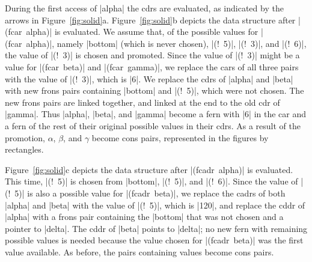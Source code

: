 During the first access of \scheme|alpha| the cdrs are evaluated, as
indicated by the arrows in Figure~\ref{fig:solid}a.
Figure~\ref{fig:solid}b depicts the data structure after
\mbox{\scheme|(fcar alpha)|} is evaluated. We assume that, of the
possible values for \mbox{\scheme|(fcar alpha)|}, namely
\scheme|bottom| (which is never chosen), \mbox{\scheme|(! 5)|},
\mbox{\scheme|(! 3)|}, and \mbox{\scheme|(! 6)|}, the value of
\mbox{\scheme|(! 3)|} is chosen and promoted. Since the value
of \mbox{\scheme|(! 3)|} might be a value for \mbox{\scheme|(fcar beta)|}
 and \mbox{\scheme|(fcar gamma)|}, we replace the cars of all
three pairs with the value of \mbox{\scheme|(! 3)|}, which
is \schemeresult|6|. We replace the cdrs of \scheme|alpha| and
\scheme|beta| with new frons pairs containing \scheme|bottom| and
\mbox{\scheme|(! 5)|}, which were not chosen. The new frons pairs are
linked together, and linked at the end to the old cdr of
\scheme|gamma|. Thus \scheme|alpha|, \scheme|beta|, and \scheme|gamma|
become a fern with \schemeresult|6| in the car and a fern of the
rest of their original possible values in their cdrs.  As a result of
the promotion, $\alpha$, $\beta$, and $\gamma$ become cons pairs,
represented in the figures by rectangles.

Figure~\ref{fig:solid}c depicts the data structure after
\mbox{\scheme|(fcadr alpha)|} is evaluated. This time,
\mbox{\scheme|(! 5)|} is chosen from \scheme|bottom|, \mbox{\scheme|(! 5)|}, 
and \mbox{\scheme|(! 6)|}.  Since the value of \mbox{\scheme|(! 5)|} is
also a possible value for \mbox{\scheme|(fcadr beta)|}, we replace
the cadrs of both \scheme|alpha| and \scheme|beta| with the value of
\mbox{\scheme|(! 5)|}, which is \schemeresult|120|, and replace the cddr of
\scheme|alpha| with a frons pair containing the \scheme|bottom| that
was not chosen and a pointer to \scheme|delta|. The cddr of \scheme|beta| points to \scheme|delta|; no
new fern with remaining possible values is needed because the value
chosen for \mbox{\scheme|(fcadr beta)|} was the first value
available. As before, the pairs containing values become cons pairs.



